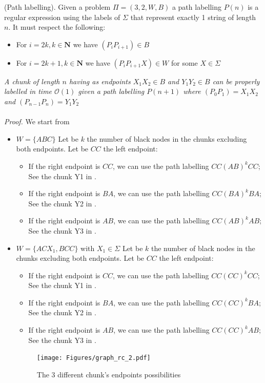 \begin{defi}
(Path labelling). Given a problem $\Pi=(3,2,W,B)$ a path labelling $P(n)$ is a regular expression using the labels of $\Sigma$ that represent exactly 1 string of length $n$. It must respect the following:
\begin{itemize}
    \item For $i=2k, k\in\mathbf{N}$ we have $(P_iP_{i+1})\in B$
    \item For $i=2k+1, k\in\mathbf{N}$ we have $(P_iP_{i+1}X)\in W$ for some $X\in \Sigma$
\end{itemize}
\end{defi}

\begin{claim}
\textit{A chunk of length $n$ having as endpoints $X_1X_2\in B$ and $Y_1Y_2\in B$ can be properly labelled in time $\mathcal{O}(1)$ given a path labelling $P(n+1)$ where $(P_0P_1)=X_1X_2$ and $(P_{n-1}P_n)=Y_1Y_2$}\\\\
\textit{Proof.} We start from
\end{claim}

\begin{itemize}
    \item $W=\{ABC\}$
    Let be $k$ the number of black nodes in the chunks excluding both endpoints.
    Let be $CC$ the left endpoint:
    \begin{itemize}
        \item If the right endpoint is $CC$, we can use the path labelling $CC(AB)^kCC$; See the chunk Y1 in .
        \item If the right endpoint is $BA$, we can use the path labelling $CC(BA)^kBA$; See the chunk Y2 in .
        \item If the right endpoint is $AB$, we can use the path labelling $CC(AB)^kAB$; See the chunk Y3 in .
    \end{itemize}
    \item $W=\{ACX_1,BCC\}$ with $X_1\in \Sigma$
    Let be $k$ the number of black nodes in the chunks excluding both endpoints.
    Let be $CC$ the left endpoint:
    \begin{itemize}
        \item If the right endpoint is $CC$, we can use the path labelling $CC(CC)^kCC$; See the chunk Y1 in .
        \item If the right endpoint is $BA$, we can use the path labelling $CC(CC)^kBA$; See the chunk Y2 in .
        \item If the right endpoint is $AB$, we can use the path labelling $CC(CC)^kAB$; See the chunk Y3 in .
    \end{itemize}
    \begin{figure}[htb]
    \centering
    \texttt{[image: Figures/graph\_rc\_2.pdf]}
    \caption{The 3 different chunk's endpoints possibilities}
    \label{fig:global_1}
\end{figure}
\end{itemize}

